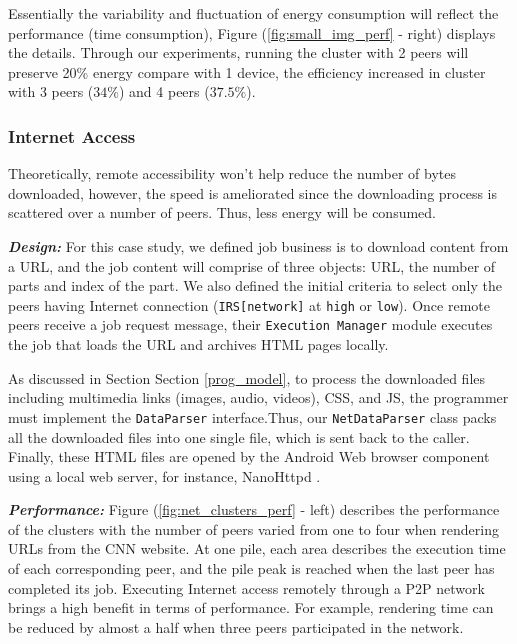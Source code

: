 \documentclass{sig-alternate}
\begin{document}
Essentially the variability and fluctuation of energy consumption will reflect the performance (time consumption), Figure (\ref{fig:small_img_perf} - right) displays the details. Through our experiments, running the cluster with 2 peers will preserve 20\% energy compare with 1 device, the efficiency increased in cluster with 3 peers ($34\%$) and 4 peers ($37.5\%$).


\subsubsection{Internet Access} 
Theoretically, remote accessibility won't help reduce the number of bytes downloaded, however, the speed is ameliorated since the downloading process is scattered over a number of peers. Thus, less energy will be consumed. 

\textbf{\emph{Design:}}
For this case study, we defined job business is to download content from a URL, and the job content will comprise of three objects: URL, the number of parts and index of the part. We also defined the initial criteria to select only the peers having Internet connection (\texttt{IRS[network]} at \texttt{high} or \texttt{low}). Once remote peers receive a job request message, their \texttt{Execution Manager} module executes the job that loads the URL and archives HTML pages locally. 

As discussed in Section Section \ref{prog_model}, to process the downloaded files including multimedia links (images, audio, videos), CSS, and JS, the programmer must implement the \texttt{DataParser} interface.Thus, our \texttt{NetDataParser} class packs all the downloaded files into one single file, which is sent back to the caller. Finally, these HTML files are opened by the Android Web browser component using a local web server, for instance, NanoHttpd \cite{nanohttpd}.

\textbf{\emph{Performance:}}
Figure (\ref{fig:net_clusters_perf} - left) describes the performance of the clusters with the number of peers varied from one to four when rendering URLs from the CNN website. At one pile, each area describes the execution time of each corresponding peer, and the pile peak is reached when the last peer has completed its job. Executing Internet access remotely through a P2P network brings a high benefit in terms of performance. For example, rendering time can be reduced by almost a half when three peers participated in the network. 
\end{document}
